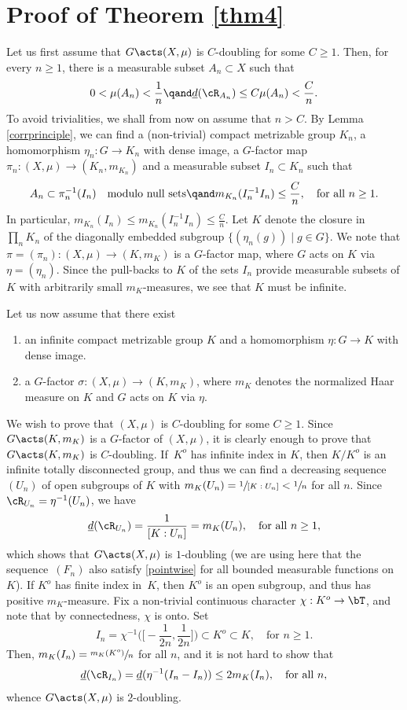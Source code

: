 \section{Proof of Theorem \ref{thm4}}

Let us first assume that $G \acts (X,\mu)$ is $C$\nobreakdash-doubling for some $C \geq 1$. Then, for every $n \geq 1$, there is
a measurable subset $A_n \subset X$ such that
\[
0 < \mu(A_n) < \frac{1}{n} \qand \underline{d}(\cR_{A_n}) \leq C\mu(A_n) < \frac{C}{n}.
\]
To avoid trivialities, we shall from now on assume that $n > C$. By Lemma \ref{corrprinciple}, we can find a (non-trivial) compact metrizable
group $K_n$, a homomorphism $\eta_n : G \to K_n$ with dense image, a $G$-factor map $\pi_n : (X,\mu) \to (K_n,m_{K_n})$ and
a measurable subset $I_n \subset K_n$ such that
\[
A_n \subset \pi_n^{-1}(I_n) \quad \textrm{modulo null sets} \qand m_{K_n}(I_n^{-1} I_n) \leq \frac{C}{n}, \quad \textrm{for all $n \geq 1$}.
\]
In particular, $m_{K_n}(I_n) \leq m_{K_n}(I_n^{-1} I_n) \leq \frac{C}{n}$. Let $K$ denote the closure in $\prod_n K_n$ of the diagonally embedded
subgroup $\{ (\eta_n(g)) \mid  g \in G\}$. We note that $\pi = (\pi_n) : (X,\mu) \to (K,m_K)$ is a $G$-factor map, where $G$
acts on $K$ via $\eta = (\eta_n)$. Since the pull-backs to $K$ of the sets $I_n$ provide measurable subsets of $K$ with arbitrarily small $m_K$-measures, we see that $K$ must be infinite.

Let us now assume that there exist
\begin{enumerate}
\item
an infinite compact metrizable group $K$ and a homomorphism $\eta : G \to K$ with dense image.
\item
a $G$-factor $\sigma : (X,\mu) \to (K,m_K)$, where $m_K$ denotes the normalized Haar measure on $K$
and $G$ acts on $K$ via $\eta$.
\end{enumerate}
We wish to prove that $(X,\mu)$ is $C$\nobreakdash-doubling for some $C \geq 1$. Since $G \acts (K,m_K)$ is a $G$-factor of $(X,\mu)$, it is clearly
enough to prove that $G \acts (K,m_K)$ is $C$\nobreakdash-doubling. If~$K^o$ has infinite index in $K$, then $K/K^o$ is an infinite totally disconnected group,
and thus we can find a decreasing sequence $(U_n)$ of open subgroups of $K$ with $m_K(U_n) = \sfrac{1}{[K : U_n]} < \sfrac{1}{n}$ for all $n$.
Since $\cR_{U_n} = \eta^{-1}(U_n)$, we have
\[
\underline{d}(\cR_{U_n}) = \frac{1}{[K : U_n]} = m_K(U_n), \quad \textrm{for all $n \geq 1$},
\]
which shows that $G \acts (X,\mu)$ is $1$\nobreakdash-doubling (we are using here that the sequence~$(F_n)$ also satisfy \eqref{pointwise} for all bounded
measurable functions on $K$). If $K^o$ has finite index in~$K$, then $K^o$ is an open subgroup, and thus has
positive $m_K$-measure. Fix a non-trivial continuous character $\chi : K^o \to \bT$, and note that by connectedness, $\chi$ is onto. Set
\[
I_n = \chi^{-1}\Big(\Big[-\frac{1}{2n},\frac{1}{2n}\Big]\Big) \subset K^o \subset K, \quad \textrm{for $n \geq 1$}.
\]
Then, $m_K(I_n) = \sfrac{m_K(K^o)}{n}$ for all $n$, and it is not hard to show that
\[
\underline{d}(\cR_{I_n}) = \underline{d}(\eta^{-1}(I_n - I_n)) \leq 2 m_K(I_n), \quad \textrm{for all $n$},
\]
whence $G \acts (X,\mu)$ is $2$\nobreakdash-doubling.

